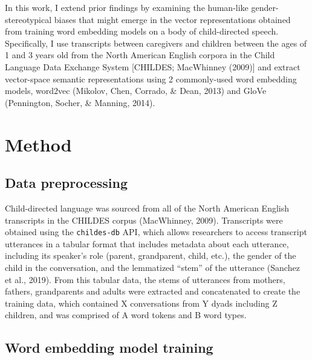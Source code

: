 \documentclass[10pt, letterpaper]{article}
\begin{document}
In this work, I extend prior findings by examining the human-like
gender-stereotypical biases that might emerge in the vector
representations obtained from training word embedding models on a body
of child-directed speech. Specifically, I use transcripts between
caregivers and children between the ages of 1 and 3 years old from the
North American English corpora in the Child Language Data Exchange
System {[}CHILDES; MacWhinney (2009){]} and extract vector-space
semantic representations using 2 commonly-used word embedding models,
word2vec (Mikolov, Chen, Corrado, \& Dean, 2013) and GloVe (Pennington,
Socher, \& Manning, 2014).

\hypertarget{method}{%
\section{Method}\label{method}}

\hypertarget{data-preprocessing}{%
\subsection{Data preprocessing}\label{data-preprocessing}}

Child-directed language was sourced from all of the North American
English transcripts in the CHILDES corpus (MacWhinney, 2009).
Transcripts were obtained using the \texttt{childes-db} API, which
allows researchers to access transcript utterances in a tabular format
that includes metadata about each utterance, including its speaker's
role (parent, grandparent, child, etc.), the gender of the child in the
conversation, and the lemmatized ``stem'' of the utterance (Sanchez et
al., 2019). From this tabular data, the stems of utterances from
mothers, fathers, grandparents and adults were extracted and
concatenated to create the training data, which contained X
conversations from Y dyads including Z children, and was comprised of A
word tokens and B word types.

\hypertarget{word-embedding-model-training}{%
\subsection{Word embedding model
training}\label{word-embedding-model-training}}
\end{document}
